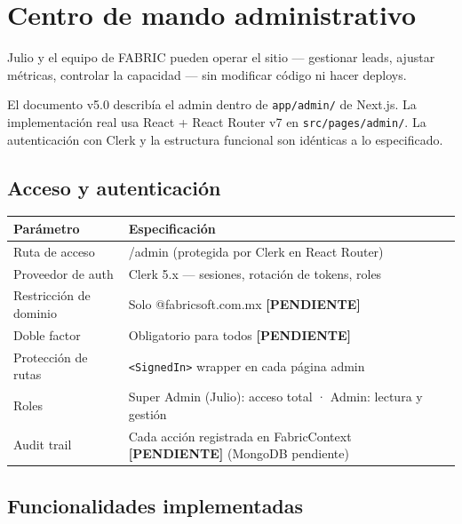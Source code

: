 \documentclass[11pt, a4paper]{article}
\newcommand{\ruta}[1]{\texttt{\color{accent2}#1}}
\newcommand{\pendientetag}{\textbf{\color{danger}[PENDIENTE]}}
\begin{document}

\section{Centro de mando administrativo}

Julio y el equipo de FABRIC pueden operar el sitio — gestionar leads, ajustar
métricas, controlar la capacidad — sin modificar código ni hacer deploys.

\begin{notatec}
El documento v5.0 describía el admin dentro de \texttt{app/admin/} de Next.js.
La implementación real usa React + React Router v7 en \ruta{src/pages/admin/}.
La autenticación con Clerk y la estructura funcional son idénticas a lo especificado.
\end{notatec}

\subsection{Acceso y autenticación}

\begin{table}[h]
\centering
\begin{tabularx}{\linewidth}{>{\ttfamily\color{accent}\small}l X}
\toprule
Parámetro & Especificación \\
\midrule
Ruta de acceso & /admin (protegida por Clerk en React Router) \\
Proveedor de auth & Clerk 5.x — sesiones, rotación de tokens, roles \\
Restricción de dominio & Solo @fabricsoft.com.mx \pendientetag \\
Doble factor & Obligatorio para todos \pendientetag \\
Protección de rutas & \texttt{<SignedIn>} wrapper en cada página admin \\
Roles & Super Admin (Julio): acceso total · Admin: lectura y gestión \\
Audit trail & Cada acción registrada en FabricContext \pendientetag{} (MongoDB pendiente) \\
\bottomrule
\end{tabularx}
\end{table}

\subsection{Funcionalidades implementadas}
\end{document}

